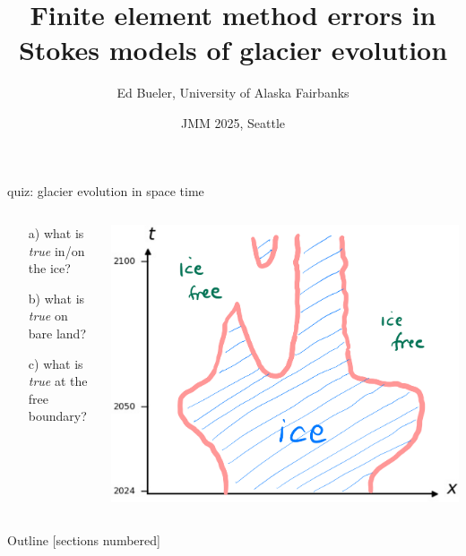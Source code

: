 \documentclass[10pt,dvipsnames]{beamer}
\title{Finite element method errors in Stokes models of glacier evolution}
\date{JMM 2025, Seattle}
\author{Ed Bueler, University of Alaska Fairbanks}
\begin{document}
\graphicspath{{../NWG24/figs/}}

\maketitle

\begin{frame}{quiz: glacier evolution in space time}

\bigskip \bigskip

\begin{columns}
\begin{column}{0.26\textwidth}
\begin{itemize}
\item[a)] what is \emph{true} in/on the ice?
\item[b)] what is \emph{true} on bare land?
\item[c)] what is \emph{true} at the free boundary?
\end{itemize}\end{column}
\begin{column}{0.74\textwidth}
\hfill \includegraphics[width=\textwidth]{xtcrop}
\end{column}
\end{columns}
\end{frame}


\begin{frame}{Outline}
  [sections numbered]
  \tableofcontents[hideallsubsections]
\end{frame}

\AtBeginSection[]
{%
}
\end{document}
